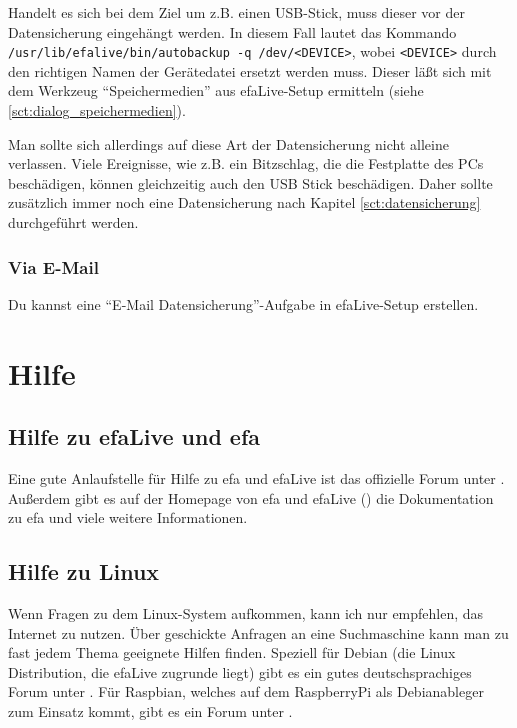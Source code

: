 \documentclass[a4paper,12pt,twoside]{article}
\begin{document}
Handelt es sich bei dem Ziel um z.B. einen USB-Stick, muss dieser vor
der Datensicherung eingehängt werden. In diesem Fall lautet das Kommando \\
\texttt{/usr/lib/efalive/bin/autobackup -q /dev/{\textless}DEVICE{\textgreater}}, wobei 
\texttt{{\textless}DEVICE{\textgreater}} durch den richtigen Namen der Gerätedatei ersetzt werden 
muss. Dieser läßt sich mit dem Werkzeug "`Speichermedien"' aus efaLive-Setup ermitteln 
(siehe \ref{sct:dialog_speichermedien}).

Man sollte sich allerdings auf diese Art der Datensicherung nicht
alleine verlassen. Viele Ereignisse, wie z.B. ein Bitzschlag, die die
Festplatte des PCs beschädigen, können gleichzeitig auch den USB Stick
beschädigen. Daher sollte zusätzlich immer noch eine Datensicherung
nach Kapitel \ref{sct:datensicherung} durchgeführt werden.


\subsubsection{Via E-Mail}
\label{cont_mail}
Du kannst eine "`E-Mail Datensicherung"'-Aufgabe in efaLive-Setup erstellen.


\section{Hilfe}
\label{sct:hilfe}
\subsection{Hilfe zu efaLive und efa}
\label{sct:hilfe_efa}
Eine gute Anlaufstelle für Hilfe zu efa und efaLive ist das offizielle
Forum unter \cite{EFA3}. Außerdem gibt es auf der Homepage von efa und
efaLive (\cite{EFA1}\cite{EFA4}\cite{EFA5}) die Dokumentation zu efa
und viele weitere Informationen.


\subsection{Hilfe zu Linux}
\label{sct:hilfe_linux}
Wenn Fragen zu dem Linux-System aufkommen, kann ich nur empfehlen, das
Internet zu nutzen. Über geschickte Anfragen an eine Suchmaschine kann
man zu fast jedem Thema geeignete Hilfen finden. Speziell für Debian
(die Linux Distribution, die efaLive zugrunde liegt) gibt es ein gutes
deutschsprachiges Forum unter \cite{HLP1}. Für Raspbian, welches auf 
dem RaspberryPi als Debianableger zum Einsatz kommt, gibt es ein Forum 
unter \cite{RSP1}.
\end{document}
